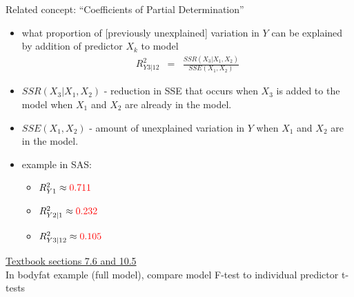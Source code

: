 \documentclass[12pt]{notes}
\begin{document}
\begin{minipage}[l][3cm][c]{\textwidth}
\end{minipage}

Related concept: ``Coefficients of Partial Determination''
\begin{itemize}
  \item what proportion of [previously unexplained] variation in $Y$
  can be explained by addition of predictor $X_k$ to model
    \begin{eqnarray}
      R^2_{Y3|12} & = & \frac{SSR(X_3 | X_1, X_2)}{SSE(X_1,X_2)}
      \nonumber
    \end{eqnarray}
    
    \bi
    \item $SSR(X_3 | X_1, X_2)$ - reduction in SSE that occurs when $X_3$ is added to the model when $X_1$ and $X_2$ are already in the model. 
    \item $SSE(X_1, X_2)$ - amount of unexplained variation in $Y$ when $X_1$ and $X_2$ are in the model. 
    \ei
    
  \item example in SAS:
    \begin{itemize}
       \item $R^2_{Y1} \approx {\color{red} 0.711}$
       \item $R^2_{Y2|1} \approx {\color{red} 0.232}$
       \item $R^2_{Y3|12} \approx {\color{red} 0.105}$
    \end{itemize}
\end{itemize}

\begin{minipage}[l][3cm][c]{\textwidth}
\end{minipage}

\underline{Textbook sections 7.6 and 10.5}\\

In bodyfat example (full model), compare model F-test to
individual predictor t-tests\\

\vspace{1em}













\end{document}
